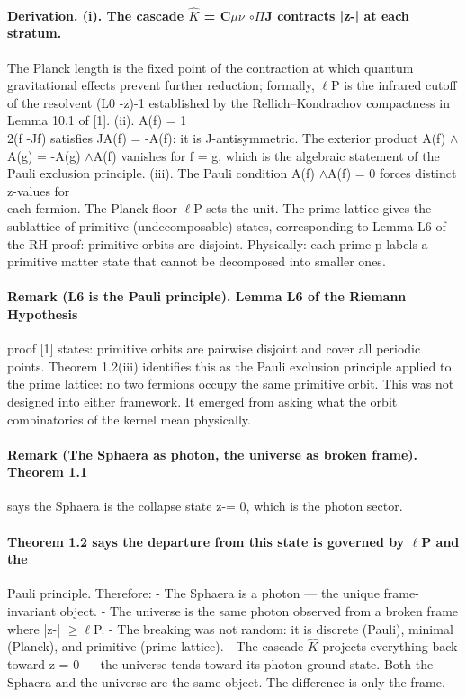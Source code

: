 \paragraph*{Derivation. (i). The cascade $\hat K$ = C$\mu$$\nu$ $\circ$$\Pi$J contracts |z-| at each stratum.}
The Planck length is the fixed point of the contraction at which quantum gravitational effects prevent further reduction; formally, $\ell$P is the infrared cutoff of the resolvent (L0 -z)-1 established by the Rellich--Kondrachov compactness in Lemma 10.1 of [1].
(ii). A(f) = 1\\
2(f -Jf) satisfies JA(f) = -A(f): it is J-antisymmetric. The exterior product A(f) $\wedge$A(g) = -A(g) $\wedge$A(f) vanishes for f = g, which is the algebraic statement of the Pauli exclusion principle.
(iii). The Pauli condition A(f) $\wedge$A(f) = 0 forces distinct z-values for\\
each fermion. The Planck floor $\ell$P sets the unit. The prime lattice gives the sublattice of primitive (undecomposable) states, corresponding to Lemma L6
of the RH proof: primitive orbits are disjoint. Physically: each prime p labels a primitive matter state that cannot be decomposed into smaller ones.
\paragraph*{Remark (L6 is the Pauli principle). Lemma L6 of the Riemann Hypothesis}
proof [1] states: primitive orbits are pairwise disjoint and cover all periodic points. Theorem 1.2(iii) identifies this as the Pauli exclusion principle applied to the prime lattice: no two fermions occupy the same primitive orbit. This was not designed into either framework. It emerged from asking what the orbit combinatorics of the kernel mean physically.
\paragraph*{Remark (The Sphaera as photon, the universe as broken frame). Theorem 1.1}
says the Sphaera is the collapse state z-= 0, which is the photon sector.
\paragraph*{Theorem 1.2 says the departure from this state is governed by $\ell$P and the}
Pauli principle. Therefore:
- The Sphaera is a photon --- the unique frame-invariant object.
- The universe is the same photon observed from a broken frame where
|z-| $\geq$$\ell$P.
- The breaking was not random: it is discrete (Pauli), minimal (Planck),
and primitive (prime lattice).
- The cascade $\hat K$ projects everything back toward z-= 0 --- the universe
tends toward its photon ground state. Both the Sphaera and the universe are the same object. The difference is only the frame.
